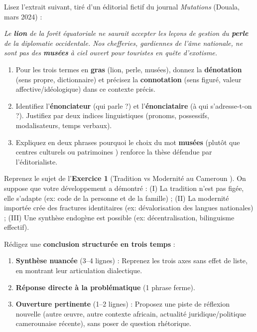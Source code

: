\documentclass[11pt]{article}
\begin{document}
\begin{exercice}
Lisez l'extrait suivant, tiré d'un éditorial fictif du journal \textit{Mutations} (Douala, mars 2024) :

\og \textit{Le \textbf{lion} de la forêt équatoriale ne saurait accepter les leçons de gestion du \textbf{perle} de la diplomatie occidentale. Nos chefferies, gardiennes de l'âme nationale, ne sont pas des \textbf{musées} à ciel ouvert pour touristes en quête d'exotisme.} \fg{}

\begin{enumerate}
    \item Pour les trois termes en \textbf{gras} (\og lion\fg{}, \og perle\fg{}, \og musées\fg{}), donnez la \textbf{dénotation} (sens propre, dictionnaire) et précisez la \textbf{connotation} (sens figuré, valeur affective/idéologique) dans ce contexte précis.
    \item Identifiez l'\textbf{énonciateur} (qui parle ?) et l'\textbf{énonciataire} (à qui s'adresse-t-on ?). Justifiez par deux indices linguistiques (pronoms, possessifs, modalisateurs, temps verbaux).
    \item Expliquez en deux phrases pourquoi le choix du mot \og \textbf{musées} \fg{} (plutôt que \og centres culturels \fg{} ou \og patrimoines \fg{}) renforce la thèse défendue par l'éditorialiste.
\end{enumerate}
\end{exercice}

\begin{exercice}
Reprenez le sujet de l'\textbf{Exercice 1} (\og Tradition vs Modernité au Cameroun \fg{}). On suppose que votre développement a démontré : (I) La tradition n'est pas figée, elle s'adapte (ex: code de la personne et de la famille) ; (II) La modernité importée crée des fractures identitaires (ex: dévalorisation des langues nationales) ; (III) Une synthèse endogène est possible (ex: décentralisation, bilinguisme effectif).

Rédigez une \textbf{conclusion structurée en trois temps} :
\begin{enumerate}
    \item \textbf{Synthèse nuancée} (3--4 lignes) : Reprenez les trois axes sans effet de liste, en montrant leur articulation dialectique.
    \item \textbf{Réponse directe à la problématique} (1 phrase ferme).
    \item \textbf{Ouverture pertinente} (1--2 lignes) : Proposez une piste de réflexion nouvelle (autre œuvre, autre contexte africain, actualité juridique/politique camerounaise récente), sans poser de question rhétorique.
\end{enumerate}
\end{exercice}
\end{document}
